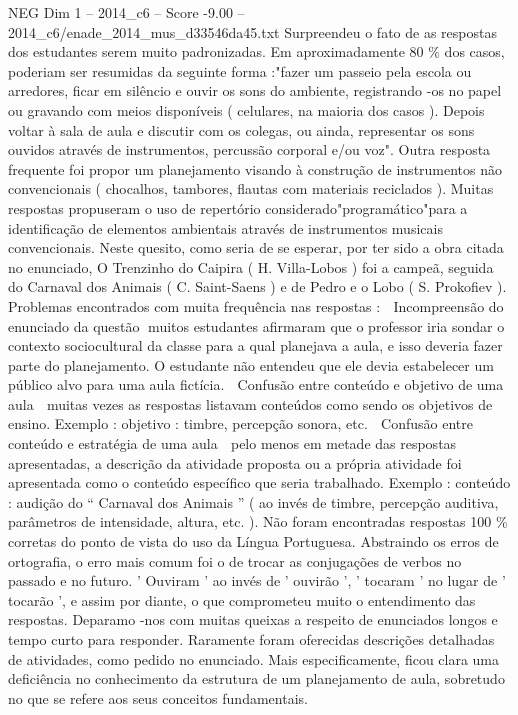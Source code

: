 \begin{textsample}{NEG Dim 1 – 2014\_c6 – Score -9.00 – 2014\_c6/enade\_2014\_mus\_d33546da45.txt}
Surpreendeu o fato de as respostas dos estudantes serem muito padronizadas.
Em aproximadamente 80 \% dos casos, poderiam ser resumidas da seguinte forma :"fazer um passeio pela escola ou arredores, ficar em silêncio e ouvir os sons do ambiente, registrando -os no papel ou gravando com meios disponíveis ( celulares, na maioria dos casos ).
Depois voltar à sala de aula e discutir com os colegas, ou ainda, representar os sons ouvidos através de instrumentos, percussão corporal e/ou voz".
Outra resposta frequente foi propor um planejamento visando à construção de instrumentos não convencionais ( chocalhos, tambores, flautas com materiais reciclados ).
Muitas respostas propuseram o uso de repertório considerado"programático"para a identificação de elementos ambientais através de instrumentos musicais convencionais.
Neste quesito, como seria de se esperar, por ter sido a obra citada no enunciado, O Trenzinho do Caipira ( H.
Villa-Lobos ) foi a campeã, seguida do Carnaval dos Animais ( C.
Saint-Saens ) e de Pedro e o Lobo ( S.
Prokofiev ).
Problemas encontrados com muita frequência nas respostas :  Incompreensão do enunciado da questão muitos estudantes afirmaram que o professor iria sondar o contexto sociocultural da classe para a qual planejava a aula, e isso deveria fazer parte do planejamento.
O estudante não entendeu que ele devia estabelecer um público alvo para uma aula fictícia.  Confusão entre conteúdo e objetivo de uma aula  muitas vezes as respostas listavam conteúdos como sendo os objetivos de ensino.
Exemplo : objetivo : timbre, percepção sonora, etc.  Confusão entre conteúdo e estratégia de uma aula  pelo menos em metade das respostas apresentadas, a descrição da atividade proposta ou a própria atividade foi apresentada como o conteúdo específico que seria trabalhado.
Exemplo : conteúdo : audição do “ Carnaval dos Animais ” ( ao invés de timbre, percepção auditiva, parâmetros de intensidade, altura, etc. ).
Não foram encontradas respostas 100 \% corretas do ponto de vista do uso da Língua Portuguesa.
Abstraindo os erros de ortografia, o erro mais comum foi o de trocar as conjugações de verbos no passado e no futuro. ' Ouviram ' ao invés de ' ouvirão ', ' tocaram ' no lugar de ' tocarão ', e assim por diante, o que comprometeu muito o entendimento das respostas.
Deparamo -nos com muitas queixas a respeito de enunciados longos e tempo curto para responder.
Raramente foram oferecidas descrições detalhadas de atividades, como pedido no enunciado.
Mais especificamente, ficou clara uma deficiência no conhecimento da estrutura de um planejamento de aula, sobretudo no que se refere aos seus conceitos fundamentais.

\end{textsample}
